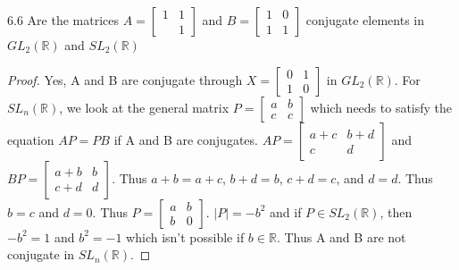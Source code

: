\documentclass{article}
\newcommand{\R}{\mathbb{R}}
\newcommand{\abs}[1]{\lvert #1\rvert}
\begin{document}
\begin{PROB}{6.6}\label{Problem 6.6.}
    Are the matrices $A = \begin{bmatrix}
        1 & 1 \\
        & 1
    \end{bmatrix}$ and $B = \begin{bmatrix}{}
        1 & 0\\
        1 & 1
    \end{bmatrix}$ conjugate elements in $GL_2(\R)$ and $SL_2(\R)$
\end{PROB}
\begin{proof}
    Yes, A and B are conjugate through $X = \begin{bmatrix}{}
        0 & 1\\
        1 & 0
    \end{bmatrix}$ in $GL_2(\R)$. For $SL_n(\R)$, we look at the general matrix $P = \begin{bmatrix}
        a & b \\
        c & c
    \end{bmatrix}$ which needs to satisfy the equation $AP = PB$ if A and B are conjugates. $AP = \begin{bmatrix}
        a + c & b+d \\
        c & d
    \end{bmatrix}$ and $BP = \begin{bmatrix}
        a + b & b \\
        c + d & d
    \end{bmatrix}$. Thus $a + b = a + c$, $b + d = b$, $c + d = c$, and $d = d$. Thus $b = c$ and $d = 0$. Thus $P = \begin{bmatrix}
        a & b \\
        b & 0
    \end{bmatrix}$. $\abs{P} = -b^2$ and if $P \in SL_2(\R)$, then $-b^2 = 1$ and $b^2 = -1$ which isn't possible if $b \in \R$. Thus A and B are not conjugate in $SL_n(\R)$.
\end{proof}

\bigskip
\end{document}
